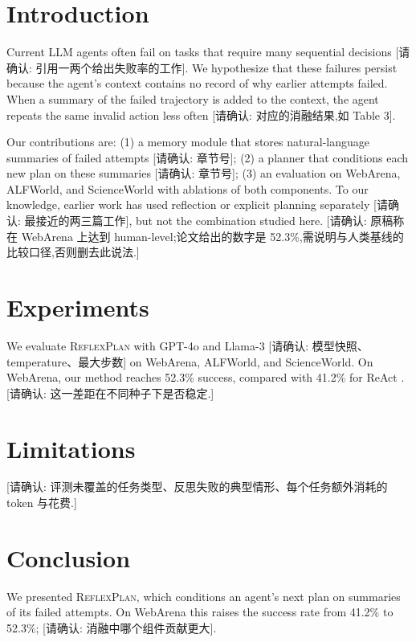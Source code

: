 \documentclass{article}
\begin{document}
\begin{abstract}
LLM agents still fail on long-horizon tasks, where a single invalid action early in a trajectory often goes unnoticed for many steps. We introduce \textsc{ReflexPlan}, which writes a short summary of each failed attempt into the agent's context and conditions the next plan on it. On WebArena, \textsc{ReflexPlan} raises the success rate from 41.2\% (ReAct) to 52.3\% [请确认: 骨干模型、种子数与标准差]. We report results on ALFWorld and ScienceWorld [请确认: 两个基准的数字] and discuss the cases where reflection does not help.
\end{abstract}

\section{Introduction}
Current LLM agents often fail on tasks that require many sequential decisions [请确认: 引用一两个给出失败率的工作]. We hypothesize that these failures persist because the agent's context contains no record of why earlier attempts failed. When a summary of the failed trajectory is added to the context, the agent repeats the same invalid action less often [请确认: 对应的消融结果,如 Table 3].

Our contributions are: (1) a memory module that stores natural-language summaries of failed attempts [请确认: 章节号]; (2) a planner that conditions each new plan on these summaries [请确认: 章节号]; (3) an evaluation on WebArena, ALFWorld, and ScienceWorld with ablations of both components. To our knowledge, earlier work has used reflection or explicit planning separately [请确认: 最接近的两三篇工作], but not the combination studied here. [请确认: 原稿称在 WebArena 上达到 human-level;论文给出的数字是 52.3\%,需说明与人类基线的比较口径,否则删去此说法.]

\section{Experiments}
We evaluate \textsc{ReflexPlan} with GPT-4o and Llama-3 [请确认: 模型快照、temperature、最大步数] on WebArena, ALFWorld, and ScienceWorld. On WebArena, our method reaches 52.3\% success, compared with 41.2\% for ReAct \cite{yao2023react}. [请确认: 这一差距在不同种子下是否稳定.]

\section{Limitations}
[请确认: 评测未覆盖的任务类型、反思失败的典型情形、每个任务额外消耗的 token 与花费.]

\section{Conclusion}
We presented \textsc{ReflexPlan}, which conditions an agent's next plan on summaries of its failed attempts. On WebArena this raises the success rate from 41.2\% to 52.3\%; [请确认: 消融中哪个组件贡献更大].
\end{document}
